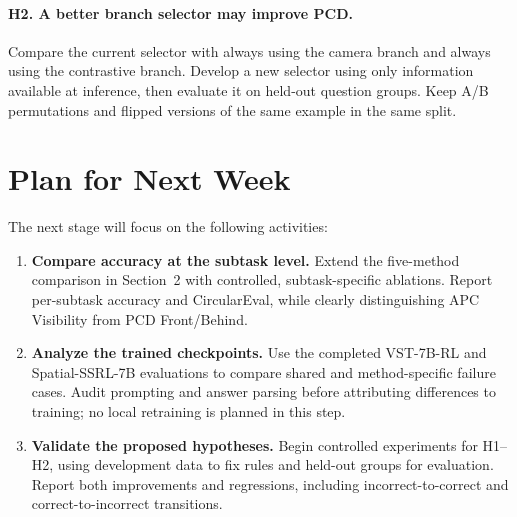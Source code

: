 \documentclass[runningheads]{llncs}
\begin{document}
\paragraph{H2. A better branch selector may improve PCD.}
Compare the current selector with always using the camera branch and always using the contrastive branch. Develop a new selector using only information available at inference, then evaluate it on held-out question groups. Keep A/B permutations and flipped versions of the same example in the same split.

\section{Plan for Next Week}

The next stage will focus on the following activities:

\begin{enumerate}
    \item \textbf{Compare accuracy at the subtask level.} Extend the five-method comparison in Section~2 with controlled, subtask-specific ablations. Report per-subtask accuracy and CircularEval, while clearly distinguishing APC Visibility from PCD Front/Behind.
    \item \textbf{Analyze the trained checkpoints.} Use the completed VST-7B-RL and Spatial-SSRL-7B evaluations to compare shared and method-specific failure cases. Audit prompting and answer parsing before attributing differences to training; no local retraining is planned in this step.
    \item \textbf{Validate the proposed hypotheses.} Begin controlled experiments for H1--H2, using development data to fix rules and held-out groups for evaluation. Report both improvements and regressions, including incorrect-to-correct and correct-to-incorrect transitions.
\end{enumerate}



\end{document}
